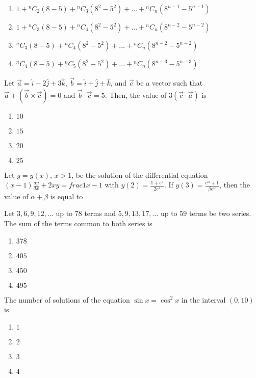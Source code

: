 \begin{enumerate}
    \item $1 + {^{n}C_2} (8 - 5) + {^{n}C_3} (8^2 - 5^2) + \ldots + {^{n}C_n} (8^{n-1} - 5^{n-1})$
    \item $1 + {^{n}C_3} (8 - 5) + {^{n}C_4} (8^2 - 5^2) + \ldots + {^{n}C_n} (8^{n-2} - 5^{n-2})$
    \item ${^{n}C_3} (8 - 5) + {^{n}C_4} (8^2 - 5^2) + \ldots + {^{n}C_n} (8^{n-2} - 5^{n-2})$
    \item ${^{n}C_4} (8 - 5) + {^{n}C_5} (8^2 - 5^2) + \ldots + {^{n}C_n} (8^{n-3} - 5^{n-3})$
\end{enumerate}
\item Let $\vec{a} = \hat{i} - 2\hat{j} + 3\hat{k}$, $\vec{b} = \hat{i} + \hat{j} + \hat{k}$, and $\vec{c}$ be a vector such that 
$\vec{a} + \left( \vec{b} \times \vec{c} \right) = 0$ and $\vec{b} \cdot \vec{c} = 5$. Then, the value of $3 \left( \vec{c} \cdot \vec{a} \right)$ is
\begin{enumerate}
    \item $10$
    \item $15$
    \item $20$
    \item $25$
\end{enumerate}
\item Let $y = y(x)$, $x > 1$, be the solution of the differential equation 
$(x - 1) \frac{dy}{dx} + 2xy = frac{1}{x - 1}$ with $y(2) = \frac{1 + e^4}{2e^4}$.
If $y(3) = \frac{e^\alpha + 1}{\beta e^\alpha}$, then the value of $\alpha + \beta$ is equal to
\item Let $3, 6, 9, 12, \dots$ up to $78$ terms and $5, 9, 13, 17, \dots$ up to $59$ terms be two series. The sum of the terms common to both series is
\begin{enumerate}
    \item $378$
    \item $405$
    \item $450$
    \item $495$
\end{enumerate}
\item The number of solutions of the equation $\sin x = \cos^2 x$ in the interval $(0, 10)$ is
\begin{enumerate}
    \item $1$
    \item $2$
    \item $3$
    \item $4$
\end{enumerate}
